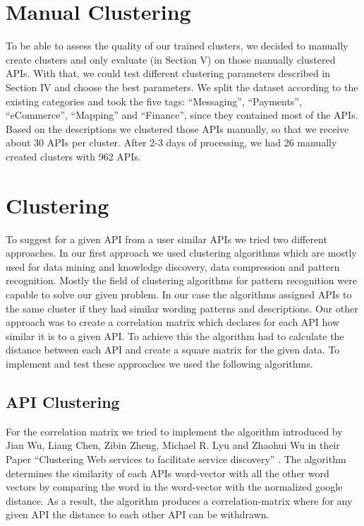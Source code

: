 \documentclass[a4paper]{IEEEtran}
\begin{document}
\section{Manual Clustering}
To be able to assess the quality of our trained clusters, we decided to manually create clusters and only evaluate (in Section V) on those manually clustered APIs. With that, we could test different clustering parameters described in Section IV and choose the best parameters. We split the dataset according to the existing categories and took the five tags: “Messaging”, “Payments”, “eCommerce”, “Mapping” and “Finance”, since they contained most of the APIs. Based on the descriptions we clustered those APIs manually, so that we receive about 30 APIs per cluster. After 2-3 days of processing, we had 26 manually created clusters with 962 APIs.

\section{Clustering}
To suggest for a given API from a user similar APIs we tried two different approaches. In our first approach we used clustering algorithms which are mostly used for data mining and knowledge discovery, data compression and pattern recognition. Mostly the field of clustering algorithms for pattern recognition were capable to solve our given problem. In our case the algorithms assigned APIs to the same cluster if they had similar wording patterns and descriptions. 
Our other approach was to create a correlation matrix which declares for each API how similar it is to a given API. To achieve this the algorithm had to calculate the distance between each API and create a square matrix for the given data.
To implement and test these approaches we used the following algorithms.

\subsection{API Clustering}
For the correlation matrix we tried to implement the algorithm introduced by Jian Wu, Liang Chen, Zibin Zheng, Michael R. Lyu and Zhaohui Wu in their Paper “Clustering Web services to facilitate service discovery” \cite{kanungo2002efficient}. The algorithm determines the similarity of each APIs word-vector with all the other word vectors by comparing the word in the word-vector with the normalized google distance. As a result, the algorithm produces a correlation-matrix where for any given API the distance to each other API can be withdrawn.
\end{document}
